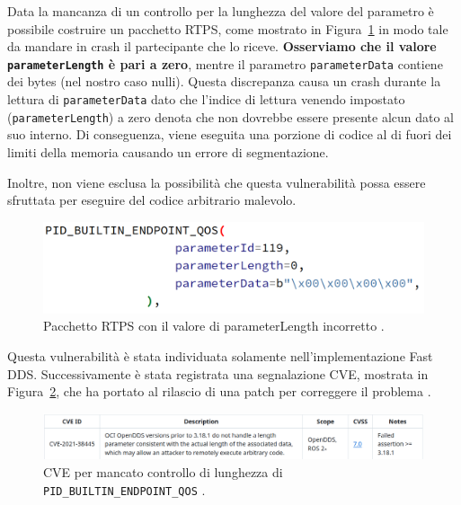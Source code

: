 Data la mancanza di un controllo per la lunghezza del 
valore del parametro è possibile costruire un pacchetto 
RTPS, come mostrato in Figura~\ref{crashnode} 
in modo tale da 
mandare in crash il partecipante che lo riceve. 
\textbf{Osserviamo che il valore 
\texttt{parameterLength} è pari a zero},
mentre il parametro \texttt{parameterData} contiene dei bytes 
(nel nostro caso nulli).
Questa discrepanza causa un crash durante la 
lettura di \texttt{parameterData} dato che l'indice di lettura 
venendo impostato (\texttt{parameterLength}) a zero 
denota che non dovrebbe essere 
presente alcun dato al suo interno. 
Di conseguenza,
viene eseguita una porzione di codice al di fuori dei 
limiti della memoria causando un errore di segmentazione.

Inoltre, 
non viene esclusa la possibilità che questa vulnerabilità 
possa essere sfruttata per eseguire del codice arbitrario 
malevolo.

\begin{figure}[H]
    \centering
    \includegraphics[width=12cm, keepaspectratio]{img/crashnode.png}
    \caption{Pacchetto RTPS con il valore di parameterLength incorretto 
    \cite{mayoral2022robot}.}
    \label{crashnode}
\end{figure}


Questa vulnerabilità è stata individuata solamente 
nell'implementazione Fast DDS.
Successivamente 
è stata registrata una segnalazione CVE, mostrata in 
Figura~\ref{CVEnodecrashing},
che ha portato 
al rilascio di una patch per correggere il problema \cite{mayoral2022robot}.


\begin{figure}[H]
    \centering
    \includegraphics[width=15.2cm, keepaspectratio]{img/CVE node crashing.png}
    \caption{CVE per mancato controllo di lunghezza 
    di \texttt{PID\_BUILTIN\_ENDPOINT\_QOS} \cite{mayoral2022robot}.}
    \label{CVEnodecrashing}
\end{figure}
